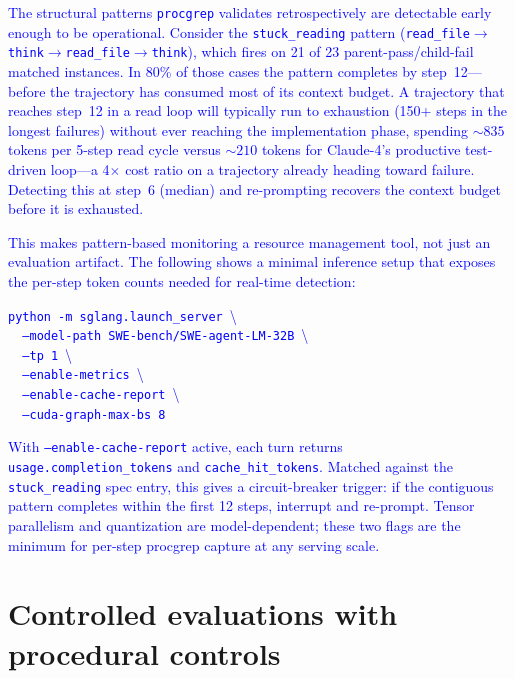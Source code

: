 \documentclass[11pt]{article}
\begin{document}
\textcolor{blue}{The structural patterns \texttt{procgrep} validates retrospectively are detectable early enough to be operational. Consider the \texttt{stuck\_reading} pattern (\texttt{read\_file}$\to$\texttt{think}$\to$\texttt{read\_file}$\to$\texttt{think}), which fires on 21 of 23 parent-pass/child-fail matched instances. In 80\% of those cases the pattern completes by step~12---before the trajectory has consumed most of its context budget. A trajectory that reaches step~12 in a read loop will typically run to exhaustion (150+ steps in the longest failures) without ever reaching the implementation phase, spending ${\sim}835$ tokens per 5-step read cycle versus ${\sim}210$ tokens for Claude-4's productive test-driven loop---a 4$\times$ cost ratio on a trajectory already heading toward failure. Detecting this at step~6 (median) and re-prompting recovers the context budget before it is exhausted.}

\textcolor{blue}{This makes pattern-based monitoring a resource management tool, not just an evaluation artifact. The following shows a minimal inference setup that exposes the per-step token counts needed for real-time detection:}

\begin{tcolorbox}[colback=black!3, colframe=black!30, boxrule=0.4pt,
  left=10pt, right=10pt, top=8pt, bottom=8pt, fontupper=\small]
\textcolor{blue}{
\texttt{python -m sglang.launch\_server}~\textbackslash\\
\texttt{~~--model-path SWE-bench/SWE-agent-LM-32B}~\textbackslash\\
\texttt{~~--tp 1}~\textbackslash\\
\texttt{~~--enable-metrics}~\textbackslash\\
\texttt{~~--enable-cache-report}~\textbackslash\\
\texttt{~~--cuda-graph-max-bs 8}
}
\end{tcolorbox}

\textcolor{blue}{With \texttt{--enable-cache-report} active, each turn returns \texttt{usage.completion\_tokens} and \texttt{cache\_hit\_tokens}. Matched against the \texttt{stuck\_reading} spec entry, this gives a circuit-breaker trigger: if the contiguous pattern completes within the first 12 steps, interrupt and re-prompt. Tensor parallelism and quantization are model-dependent; these two flags are the minimum for per-step procgrep capture at any serving scale.}

\section{Controlled evaluations with procedural controls}
\end{document}
